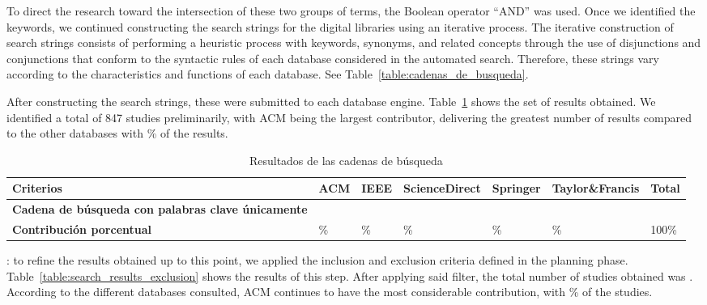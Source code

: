 To direct the research toward the intersection of these two groups of terms, the Boolean operator ``AND'' was used. Once we identified the keywords, we continued constructing the search strings for the digital libraries using an iterative process. The iterative construction of search strings consists of performing a heuristic process with keywords, synonyms, and related concepts through the use of disjunctions and conjunctions that conform to the syntactic rules of each database considered in the automated search. Therefore, these strings vary according to the characteristics and functions of each database. See Table~\ref{table:cadenas_de_busqueda}.

After constructing the search strings, these were submitted to each database engine. Table~\ref{table:search_results} shows the set of results obtained. We identified a total of 847 studies preliminarily, with ACM being the largest contributor, delivering the greatest number of results compared to the other databases with \acmp\% of the results.




\begin{table}[htbp]
	\centering
	\caption{Resultados de las cadenas de búsqueda}
	\label{table:search_results}
	\renewcommand{\arraystretch}{1}  %
	\begin{tabular}{p{4.8cm}p{1.7cm}p{1.7cm}p{1.7cm}p{1.7cm}p{2cm}p{1.4cm}}
		\toprule
		\textbf{Criterios}                                        & \textbf{ACM} & \textbf{IEEE} & \textbf{ScienceDirect} & \textbf{Springer} & \textbf{Taylor\&Francis} & \textbf{Total} \\
		\midrule
		\textbf{Cadena de búsqueda con palabras clave únicamente} & \acm{}       & \ieee{}       & \sd{}                  & \spr{}            & \tf{}                    & \tot{}         \\
		\addlinespace[0.8em]
		\textbf{Contribución porcentual}                          & \acmp{}\%    & \ieeep{}\%    & \sdp{}\%               & \sprp{}\%         & \tfp{}\%                 & 100\%          \\
		\bottomrule
	\end{tabular}
\end{table}




: to refine the results obtained up to this point, we applied the inclusion and exclusion criteria defined in the planning phase. Table~\ref{table:search_results_exclusion} shows the results of this step. After applying said filter, the total number of studies obtained was \itot. According to the different databases consulted, ACM continues to have the most considerable contribution, with \iacmp\% of the studies.

